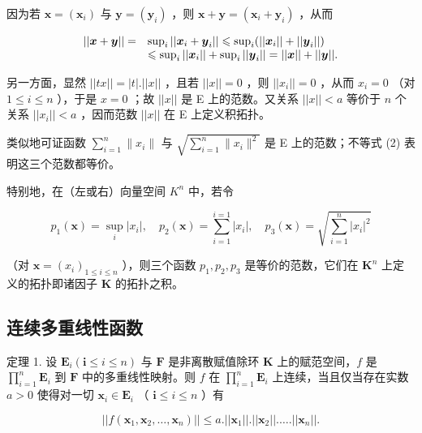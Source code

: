 因为若 \(\pmb{x} = (\pmb{x}_i)\) 与 \(\pmb{y} = (\pmb{y}_i)\) ，则 \(\pmb{x} + \pmb{y} = (\pmb{x}_i + \pmb{y}_i)\) ，从而

\[
\begin{array}{r l} | | \boldsymbol {x} + \boldsymbol {y} | | = & \sup _ {i} | | \boldsymbol {x} _ {i} + \boldsymbol {y} _ {i} | | \leqslant \sup _ {i} (| | \boldsymbol {x} _ {i} | | + | | \boldsymbol {y} _ {i} | |) \\ & \leqslant \sup _ {i} | | \boldsymbol {x} _ {i} | | + \sup _ {i} | | \boldsymbol {y} _ {i} | | = | | \boldsymbol {x} | | + | | \boldsymbol {y} | |. \end{array}
\]

另一方面，显然 \(||tx|| = |t|.||x||\) ，且若 \(||x|| = 0\) ，则 \(||x_i|| = 0\) ，从而 \(x_i = 0\) （对 \(1 \leqslant i \leqslant n\) ），于是 \(x = 0\) ；故 \(||x||\) 是 E 上的范数。又关系 \(||x|| < a\) 等价于 \(n\) 个关系 \(||x_i|| < a\) ，因而范数 \(||x||\) 在 E 上定义积拓扑。

类似地可证函数 \(\sum_{i=1}^{n} \|x_i\|\) 与 \(\sqrt{\sum_{i=1}^{n} \|x_i\|^2}\) 是 E 上的范数；不等式 (2) 表明这三个范数都等价。

特别地，在（左或右）向量空间 \(K^{n}\) 中，若令

\[
p _ {1} (\boldsymbol {x}) = \sup _ {i} | x _ {i} |, \quad p _ {2} (\boldsymbol {x}) = \sum_ {i = 1} ^ {i = 1} | x _ {i} |, \quad p _ {3} (\boldsymbol {x}) = \sqrt {\sum_ {i = 1} ^ {n} | x _ {i} | ^ {2}}
\]

（对 \(\pmb{x} = (x_{i})_{1\leqslant i\leqslant n}\) ），则三个函数 \(p_1, p_2, p_3\) 是等价的范数，它们在 \(\mathbf{K}^n\) 上定义的拓扑即诸因子 \(\mathbf{K}\) 的拓扑之积。

\subsection{连续多重线性函数}

定理 1. 设 \(\mathbf{E}_i(\mathbf{i} \leqslant i \leqslant n)\) 与 \(\mathbf{F}\) 是非离散赋值除环 \(\mathbf{K}\) 上的赋范空间，\(f\) 是 \(\prod_{i=1}^{n} \mathbf{E}_i\) 到 \(\mathbf{F}\) 中的多重线性映射。则 \(f\) 在 \(\prod_{i=1}^{n} \mathbf{E}_i\) 上连续，当且仅当存在实数 \(a > 0\) 使得对一切 \(\boldsymbol{x}_i \in \mathbf{E}_i\) （ \(\mathbf{i} \leqslant i \leqslant n\) ）有

\[
\left| \left| f \left(\boldsymbol {x} _ {1}, \boldsymbol {x} _ {2}, \dots , \boldsymbol {x} _ {n}\right) \right| \right| \leqslant a. \left| \left| \boldsymbol {x} _ {1} \right| \right|. \left| \left| \boldsymbol {x} _ {2} \right| \right|. \dots . \left| \left| \boldsymbol {x} _ {n} \right| \right|.\tag{3}
\]

